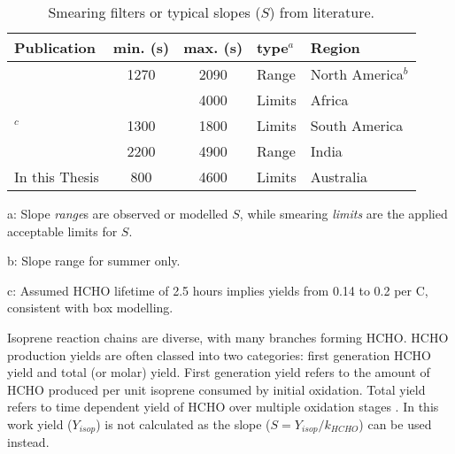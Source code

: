       \begin{table}\begin{threeparttable}
          \caption{Smearing filters or typical slopes ($S$) from literature.}
          \begin{tabular}{ l | c  c  l  >{\centering\arraybackslash}p{3cm} } 
            \toprule
            Publication & min. (s) & max. (s) & type$^a$ & Region \\
            \midrule
            \textcite{Palmer2003}      & 1270 & 2090 & Range & North America$^{b}$ \\
            \textcite{Marais2012}      &      & 4000 & Limits & Africa \\
            \textcite{Barkley2013}$^c$ & 1300 & 1800 & Limits & South America \\
            \textcite{Surl2018}        & 2200 & 4900 & Range & India \\
            In this Thesis             & 800  & 4600 & Limits & Australia \\
            \bottomrule
          \end{tabular}
          \begin{tablenotes} 
            \item a: Slope \textit{range}s are observed or modelled $S$, while smearing \textit{limits} are the applied acceptable limits for $S$. 
            \item b: Slope range for summer only.
            \item c: Assumed HCHO lifetime of 2.5 hours implies yields from 0.14 to 0.2 per C, consistent with box modelling.
          \end{tablenotes}
          \label{BioIsop:method:smearing:tab_smearing_ranges}
        \end{threeparttable}\end{table}
      
      
    
    Isoprene reaction chains are diverse, with many branches forming HCHO. 
    HCHO production yields are often classed into two categories: first generation HCHO yield and total (or molar) yield.
    First generation yield refers to the amount of HCHO produced per unit isoprene consumed by initial oxidation.
    Total yield refers to time dependent yield of HCHO over multiple oxidation stages \parencite{Wolfe2016}.
    In this work yield ($Y_{isop}$) is not calculated as the slope ($S = Y_{isop}/k_{HCHO}$) can be used instead.
    
